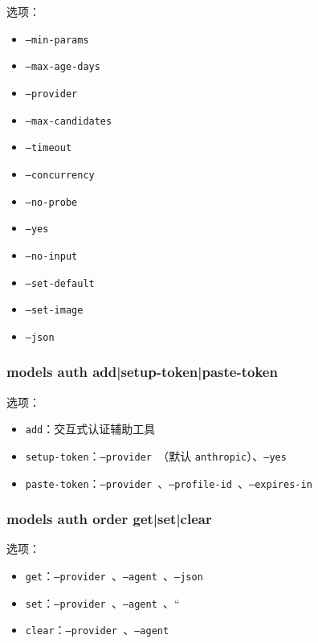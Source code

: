 选项：

\begin{itemize}
  \item \texttt{--min-params }
  \item \texttt{--max-age-days }
  \item \texttt{--provider }
  \item \texttt{--max-candidates }
  \item \texttt{--timeout }
  \item \texttt{--concurrency }
  \item \texttt{--no-probe}
  \item \texttt{--yes}
  \item \texttt{--no-input}
  \item \texttt{--set-default}
  \item \texttt{--set-image}
  \item \texttt{--json}
\end{itemize}


\subsubsection{models auth add|setup-token|paste-token}


选项：

\begin{itemize}
  \item \texttt{add}：交互式认证辅助工具
  \item \texttt{setup-token}：\texttt{--provider }（默认 \texttt{anthropic}）、\texttt{--yes}
  \item \texttt{paste-token}：\texttt{--provider }、\texttt{--profile-id }、\texttt{--expires-in }
\end{itemize}


\subsubsection{models auth order get|set|clear}


选项：

\begin{itemize}
  \item \texttt{get}：\texttt{--provider }、\texttt{--agent }、\texttt{--json}
  \item \texttt{set}：\texttt{--provider }、\texttt{--agent }、``
  \item \texttt{clear}：\texttt{--provider }、\texttt{--agent }
\end{itemize}


